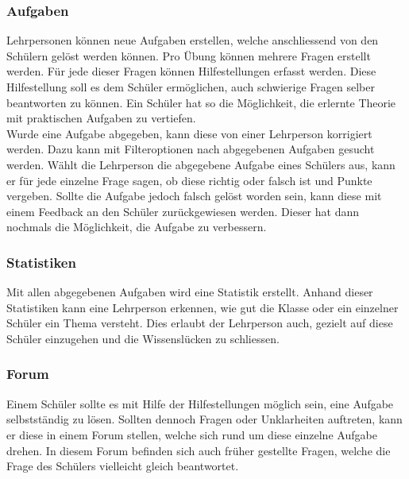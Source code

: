 \subsubsection*{Aufgaben}
Lehrpersonen können neue Aufgaben erstellen, welche anschliessend von den Schülern gelöst werden können. Pro Übung können mehrere Fragen erstellt werden. Für jede dieser Fragen können Hilfestellungen erfasst werden. Diese Hilfestellung soll es dem Schüler ermöglichen, auch schwierige Fragen selber beantworten zu können. Ein Schüler hat so die Möglichkeit, die erlernte Theorie mit praktischen Aufgaben zu vertiefen. \\

Wurde eine Aufgabe abgegeben, kann diese von einer Lehrperson korrigiert werden. Dazu kann mit Filteroptionen nach abgegebenen Aufgaben gesucht werden. Wählt die Lehrperson die abgegebene Aufgabe eines Schülers aus, kann er für jede einzelne Frage sagen, ob diese richtig oder falsch ist und Punkte vergeben. Sollte die Aufgabe jedoch falsch gelöst worden sein, kann diese mit einem Feedback an den Schüler zurückgewiesen werden. Dieser hat dann nochmals die Möglichkeit, die Aufgabe zu verbessern. 

\subsubsection*{Statistiken}
Mit allen abgegebenen Aufgaben wird eine Statistik erstellt. Anhand dieser Statistiken kann eine Lehrperson erkennen, wie gut die Klasse oder ein einzelner Schüler ein Thema versteht. Dies erlaubt der Lehrperson auch, gezielt auf diese Schüler einzugehen und die Wissenslücken zu schliessen.

\subsubsection*{Forum}
Einem Schüler sollte es mit Hilfe der Hilfestellungen möglich sein, eine Aufgabe selbstständig zu lösen. Sollten dennoch Fragen oder Unklarheiten auftreten, kann er diese in einem Forum stellen, welche sich rund um diese einzelne Aufgabe drehen. In diesem Forum befinden sich auch früher gestellte Fragen, welche die Frage des Schülers vielleicht gleich beantwortet.




\newpage